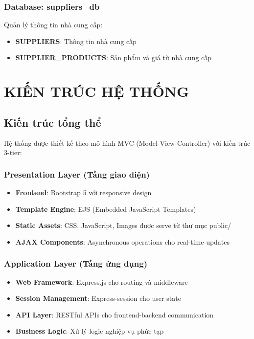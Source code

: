 \documentclass[12pt,a4paper]{article}
\begin{document}
\subsubsection{Database: suppliers\_db}
Quản lý thông tin nhà cung cấp:
\begin{itemize}
    \item \textbf{SUPPLIERS}: Thông tin nhà cung cấp
    \item \textbf{SUPPLIER\_PRODUCTS}: Sản phẩm và giá từ nhà cung cấp
\end{itemize}

\section{KIẾN TRÚC HỆ THỐNG}

\subsection{Kiến trúc tổng thể}
Hệ thống được thiết kế theo mô hình MVC (Model-View-Controller) với kiến trúc 3-tier:

\subsubsection{Presentation Layer (Tầng giao diện)}
\begin{itemize}
    \item \textbf{Frontend}: Bootstrap 5 với responsive design
    \item \textbf{Template Engine}: EJS (Embedded JavaScript Templates)
    \item \textbf{Static Assets}: CSS, JavaScript, Images được serve từ thư mục public/
    \item \textbf{AJAX Components}: Asynchronous operations cho real-time updates
\end{itemize}

\subsubsection{Application Layer (Tầng ứng dụng)}
\begin{itemize}
    \item \textbf{Web Framework}: Express.js cho routing và middleware
    \item \textbf{Session Management}: Express-session cho user state
    \item \textbf{API Layer}: RESTful APIs cho frontend-backend communication
    \item \textbf{Business Logic}: Xử lý logic nghiệp vụ phức tạp
\end{itemize}
\end{document}
